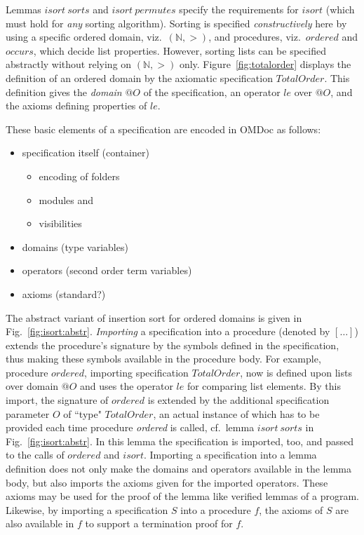 \documentclass{article}
\theoremstyle{remark}
\theoremstyle{definition}
\newcommand{\nat}{\mathbb{N}}
\newcommand{\name}[1]{\mathit{#1}}
\begin{document}
Lemmas $\name{isort}\ \name{sorts}$ and $\name{isort}\ \name{permutes}$ specify the requirements for $\name{isort}$
(which must hold for \emph{any} sorting algorithm). Sorting is specified \emph{constructively} here by using a specific
ordered domain, viz.\ $(\nat,>)$, and procedures, viz.\ $\name{ordered}$ and $\name{occurs}$, which decide list
properties. However, sorting lists can be specified abstractly without relying on $(\nat,>)$ only.
Figure~\ref{fig:totalorder} displays the definition of an ordered domain by the axiomatic specification
$\name{TotalOrder}$. This definition gives the \emph{domain} $@O$ of the specification, an operator $\name{le}$ over
$@O$, and the axioms defining properties of $\name{le}$.

These basic elements of a specification are encoded in OMDoc as follows:

\begin{itemize}

 \item specification itself (container)
   \begin{itemize}
     \item encoding of folders
     \item modules and
     \item visibilities
   \end{itemize}

 \item domains (type variables)

 \item operators (second order term variables)

 \item axioms (standard?)

\end{itemize}


The abstract variant of insertion sort for ordered domains is given in Fig.~\ref{fig:isort:abstr}. \emph{Importing} a
specification into a procedure (denoted by $[\ldots]$) extends the procedure's signature by the symbols defined in the
specification, thus making these symbols available in the procedure body. For example, procedure $\name{ordered}$,
importing specification $\name{TotalOrder}$, now is defined upon lists over domain $@O$ and uses the operator
$\name{le}$ for comparing list elements. By this import, the signature of $\name{ordered}$ is extended by the
additional specification parameter $O$ of ``type" $\name{TotalOrder}$, an actual instance of which has to be provided
each time procedure \emph{ordered} is called, cf.\ lemma $\name{isort}\ \name{sorts}$ in Fig.~\ref{fig:isort:abstr}. In
this lemma the specification is imported, too, and passed to the calls of $\name{ordered}$ and $\name{isort}$.
Importing a specification into a lemma definition does not only make the domains and operators available in the lemma
body, but also imports the axioms given for the imported operators. These axioms may be used for the proof of the lemma
like verified lemmas of a program. Likewise, by importing a specification $S$ into a procedure $f$, the axioms of $S$
are also available in $f$ to support a termination proof for $f$.
\end{document}
